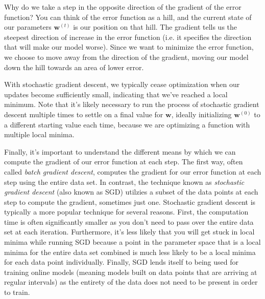 
Why do we take a step in the opposite direction of the gradient of the error function? You can think of the error function as a hill, and the current state of our parameters $\textbf{w}^{(t)}$ is our position on that hill. The gradient tells us the steepest direction of increase in the error function (i.e. it specifies the direction that will make our model worse). Since we want to minimize the error function, we choose to move away from the direction of the gradient, moving our model down the hill towards an area of lower error.

With stochastic gradient descent, we typically cease optimization when our updates become sufficiently small, indicating that we've reached a local minimum. Note that it's likely necessary to run the process of stochastic gradient descent multiple times to settle on a final value for $\textbf{w}$, ideally initializing $\textbf{w}^{(0)}$ to a different starting value each time, because we are optimizing a function with multiple local minima.

Finally, it's important to understand the different means by which we can compute the gradient of our error function at each step. The first way, often called \textit{batch gradient descent}, computes the gradient for our error function at each step using the entire data set. In contrast, the technique known as \textit{stochastic gradient descent} (also known as SGD) utilzies a subset of the data points at each step to compute the gradient, sometimes just one. Stochastic gradient descent is typically a more popular technique for several reasons. First, the computation time is often significantly smaller as you don't need to pass over the entire data set at each iteration. Furthermore, it's less likely that you will get stuck in local minima while running SGD because a point in the parameter space that is a local minima for the entire data set combined is much less likely to be a local minima for each data point individually. Finally, SGD lends itself to being used for training online models (meaning models built on data points that are arriving at regular intervals) as the entirety of the data does not need to be present in order to train.

